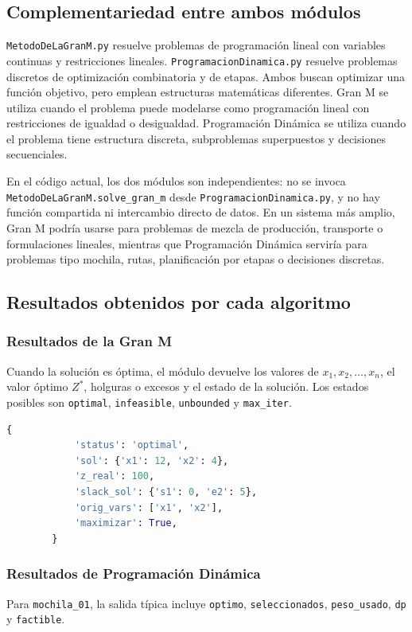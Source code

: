 \documentclass[12pt]{article}
\begin{document}
	\subsection{Complementariedad entre ambos módulos}
	\texttt{MetodoDeLaGranM.py} resuelve problemas de programación lineal con variables continuas y restricciones lineales. \texttt{ProgramacionDinamica.py} resuelve problemas discretos de optimización combinatoria y de etapas. Ambos buscan optimizar una función objetivo, pero emplean estructuras matemáticas diferentes. Gran M se utiliza cuando el problema puede modelarse como programación lineal con restricciones de igualdad o desigualdad. Programación Dinámica se utiliza cuando el problema tiene estructura discreta, subproblemas superpuestos y decisiones secuenciales.
	
	En el código actual, los dos módulos son independientes: no se invoca \texttt{MetodoDeLaGranM.solve\_gran\_m} desde \texttt{ProgramacionDinamica.py}, y no hay función compartida ni intercambio directo de datos. En un sistema más amplio, Gran M podría usarse para problemas de mezcla de producción, transporte o formulaciones lineales, mientras que Programación Dinámica serviría para problemas tipo mochila, rutas, planificación por etapas o decisiones discretas.
	
	\subsection{Resultados obtenidos por cada algoritmo}
	
	\subsubsection{Resultados de la Gran M}
	Cuando la solución es óptima, el módulo devuelve los valores de $x_1, x_2, \ldots, x_n$, el valor óptimo $Z^*$, holguras o excesos y el estado de la solución. Los estados posibles son \texttt{optimal}, \texttt{infeasible}, \texttt{unbounded} y \texttt{max\_iter}.
	
	\begin{lstlisting}[language=Python]
		{
			'status': 'optimal',
			'sol': {'x1': 12, 'x2': 4},
			'z_real': 100,
			'slack_sol': {'s1': 0, 'e2': 5},
			'orig_vars': ['x1', 'x2'],
			'maximizar': True,
		}
	\end{lstlisting}
	
	\subsubsection{Resultados de Programación Dinámica}
	Para \texttt{mochila\_01}, la salida típica incluye \texttt{optimo}, \texttt{seleccionados}, \texttt{peso\_usado}, \texttt{dp} y \texttt{factible}.
	
\end{document}
